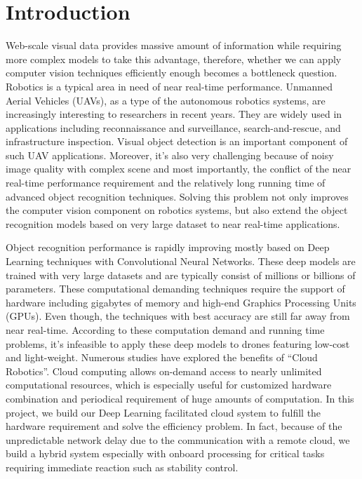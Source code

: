 \section{Introduction}
Web-scale visual data provides massive amount of information while requiring more complex models to take this advantage, therefore, whether we can apply computer vision techniques efficiently enough becomes a bottleneck question.
Robotics is a typical area in need of near real-time performance. Unmanned Aerial Vehicles (UAVs), as a type of the autonomous robotics systems, are increasingly interesting to researchers in recent years. 
They are widely used in applications including reconnaissance and surveillance, search-and-rescue, and infrastructure inspection.
Visual object detection is an important component of such UAV applications.
Moreover, it's also very challenging because of noisy image quality with complex scene and most importantly, the conflict of the near real-time performance requirement and the relatively long running time of advanced object recognition techniques.
Solving this problem not only improves the computer vision component on robotics systems, but also extend the object recognition models based on very large dataset to near real-time applications.

Object recognition performance is rapidly improving mostly based on Deep Learning techniques with Convolutional Neural Networks.
These deep models are trained with very large datasets and are typically consist of millions or billions of parameters. 
These computational demanding techniques require the support of hardware including gigabytes of memory and high-end Graphics Processing Units (GPUs). 
Even though, the techniques with best accuracy are still far away from near real-time. According to these computation demand and running time problems, it's infeasible to apply these deep models to drones featuring low-cost and light-weight.
Numerous studies have explored the benefits of ``Cloud Robotics''.
Cloud computing allows on-demand access to nearly unlimited computational resources, which is especially useful for customized hardware combination and periodical requirement of huge amounts of computation. In this project, we build our Deep Learning facilitated cloud system to fulfill the hardware requirement and solve the efficiency problem. In fact, because of the unpredictable network delay due to the communication with a remote cloud, we build a hybrid system especially with onboard processing for critical tasks requiring immediate reaction such as stability control. 

